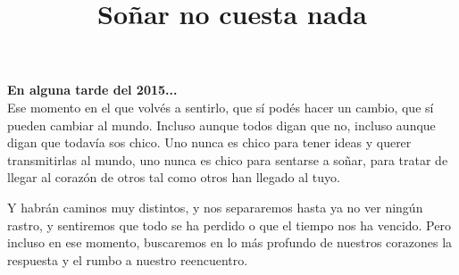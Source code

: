 \documentclass[12t, a4 paper]{article}
\title{Soñar no cuesta nada }
\date{}
\begin{document}
\maketitle

\textbf{En alguna tarde del 2015...} \\

Ese momento en el que volvés a sentirlo, que sí podés hacer un cambio, que sí pueden cambiar al mundo. Incluso aunque todos digan que no, incluso aunque digan que todavía sos chico. Uno nunca es chico para tener ideas y querer transmitirlas al mundo, uno nunca es chico para sentarse a soñar, para tratar de llegar al corazón de otros tal como otros han llegado al tuyo. 

 

Y habrán caminos muy distintos, y nos separaremos hasta ya no ver ningún rastro, y sentiremos que todo se ha perdido o que el tiempo nos ha vencido. Pero incluso en ese momento, buscaremos en lo más profundo de nuestros corazones la respuesta y el rumbo a nuestro reencuentro. 
\end{document}
